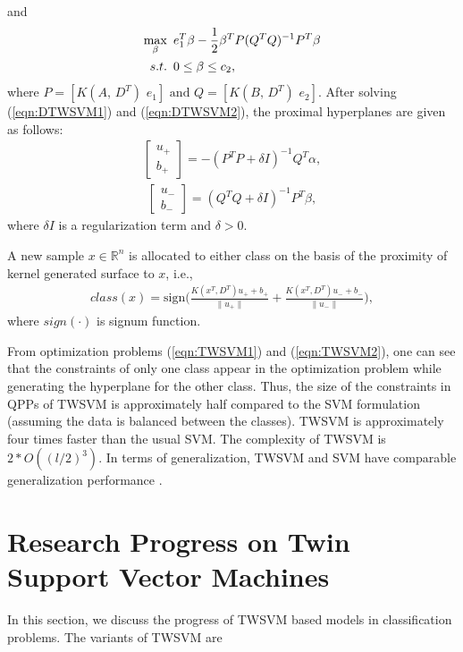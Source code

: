 \documentclass[pdflatex,sn-mathphys]{sn-jnl}%
\theoremstyle{thmstyleone}%
\theoremstyle{thmstyletwo}%
\theoremstyle{thmstylethree}%
\begin{document}
and
\begin{align}
\label{eqn:DTWSVM2}
\max_{\beta}\hspace{.5em}& e_1^T\beta-\frac{1}{2}\beta^TP(Q^TQ)^{-1}P^T\beta \notag\\
s.t.\hspace{.5em}&0\leq \beta \leq c_2,
\end{align}
where $
   P =[K(A,\,D^T)\,\,e_1]\,\,\mbox{and}\,\, Q=[K(B,\,D^T)\,\,e_2].$
After  solving (\ref{eqn:DTWSVM1}) and (\ref{eqn:DTWSVM2}), the proximal hyperplanes are given as  follows:
\begin{align}
\begin{bmatrix}
u_+\\ b_+
\end{bmatrix} =-(P^TP+\delta I)^{-1}Q^T\alpha, 
\end{align}
\begin{align}
\begin{bmatrix}
u_-\\ b_-
\end{bmatrix} =(Q^TQ+\delta I)^{-1}P^T\beta, 
\end{align}
where $\delta I$ is a regularization term and $\delta>0.$
\par A new sample $x\in \mathbb{R}^n $ is allocated to either class on the basis of the proximity of kernel generated surface to $x$, i.e.,
\begin{align}
class(x)=\mbox{sign}\Big(\frac{{K(x^T,D^T)}u_++b_+}{\|u_+\|}+\frac{{K(x^T,D^T)}u_-+b_-}{\|u_-\|}\Big),
\end{align}
where $sign(\cdot)$ is signum function.

From optimization problems (\ref{eqn:TWSVM1}) and (\ref{eqn:TWSVM2}), one can see that the constraints of only one class appear in the optimization problem
 while generating the hyperplane for the other class. Thus, the size of the constraints in QPPs of TWSVM is approximately half compared to the SVM formulation (assuming the data is balanced between the classes). TWSVM is approximately four times faster than the
usual SVM. The complexity of TWSVM is $2*O((l/2)^3)$. In terms of generalization, TWSVM and SVM have comparable generalization performance \cite{khemchandani2007twin}.
 
 
\section{Research Progress on Twin Support Vector Machines}
\label{sec:Research progress on twin support vector machines}
In this section, we discuss the progress of TWSVM based models in classification problems. The variants of TWSVM are 
\end{document}
